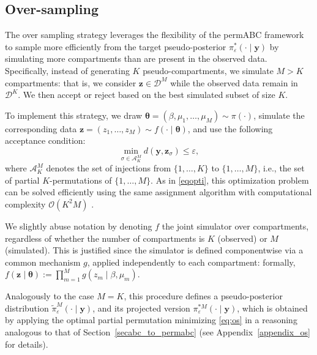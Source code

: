 \documentclass[11pt,a4paper]{article}
\def\dataspace{\mathcal{D}}
\def\globparam{\beta}
\def\locparam{\mu}
\def\obsdata{\mathbf{y}}
\def\param{\boldsymbol{\theta}}
\def\simdata{\mathbf{z}}
\theoremstyle{plain}
\theoremstyle{definition}
\theoremstyle{remark}
\begin{document}
\subsection{Over-sampling}
\label{sec:permABC_OS}

The over sampling strategy leverages the flexibility of the permABC framework to sample more efficiently from the target pseudo-posterior \( \pi_\varepsilon^*(\cdot \mid \obsdata) \) by simulating more compartments than are present in the observed data. Specifically, instead of generating \( K \) pseudo-compartments, we simulate \( M > K \) compartments: that is, we consider \( \simdata \in \dataspace^M \) while the observed data remain in \( \dataspace^K \). We then accept or reject based on the best simulated subset of size $K$.

To implement this strategy, we draw \( \param = (\globparam, \locparam_1, \dots, \locparam_M) \sim \pi(\cdot) \), simulate the corresponding data \( \simdata = (z_1, \dots, z_M) \sim f(\cdot \mid \param) \), and use the following acceptance condition:
\begin{equation}
    \label{eq:os}
    \min_{\sigma \in \mathcal{A}_K^M} d(\obsdata, \simdata_{\sigma}) \leq \varepsilon,
\end{equation}
where \( \mathcal{A}_K^M \) denotes the set of injections from \( \{1, \dots, K\} \) to \( \{1, \dots, M\} \), i.e., the set of partial \( K \)-permutations of \( \{1, \dots, M\} \). As in \eqref{eqopti}, this optimization problem can be solved efficiently using the same assignment algorithm with computational complexity \( \mathcal{O}(K^2 M) \) \citep{crouseImplementing2DRectangular2016a}.

We slightly abuse notation by denoting \( f \) the joint simulator over compartments, regardless of whether the number of compartments is \( K \) (observed) or \( M \) (simulated). This is justified since the simulator is defined componentwise via a common mechanism \( g \), applied independently to each compartment: formally, \( f(\simdata \mid \param) := \prod_{m=1}^M g(z_m \mid \globparam, \locparam_m) \).

Analogously to the case \( M = K \), this procedure defines a pseudo-posterior distribution \( \tilde{\pi}_\varepsilon^M(\cdot \mid \obsdata) \), and its projected version \( \pi_\varepsilon^{*M}(\cdot \mid \obsdata) \), which is obtained by applying the optimal partial permutation minimizing \eqref{eq:os} in a reasoning analogous to that of Section~\ref{secabc_to_permabc} (see Appendix~\ref{appendix_os} for details).
\end{document}

